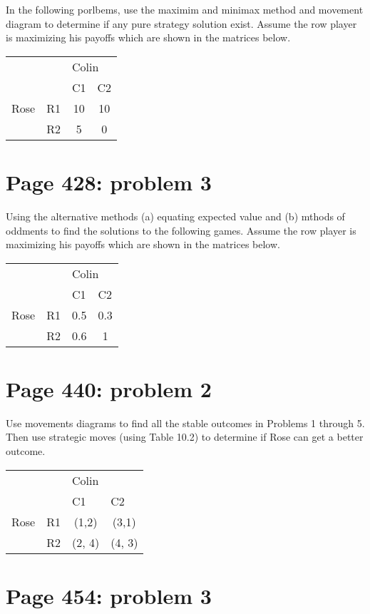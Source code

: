 \documentclass[]{article}
\begin{document}
In the following porlbems, use the maximim and minimax method and
movement diagram to determine if any pure strategy solution exist.
Assume the row player is maximizing his payoffs which are shown in the
matrices below.

\begin{table}[!h]
\centering
\begin{tabular}{lllc}
 &  & \multicolumn{2}{l}{Colin} \\ \cline{3-4}
 &  & C1 & \multicolumn{1}{l}{C2} \\ \hline
Rose & R1 & \multicolumn{1}{c}{10} & 10 \\
 & R2 & \multicolumn{1}{c}{5} & 0 \\ \hline
\end{tabular}
\end{table}

\section{Page 428: problem 3}\label{page-428-problem-3}

Using the alternative methods (a) equating expected value and (b) mthods
of oddments to find the solutions to the following games. Assume the row
player is maximizing his payoffs which are shown in the matrices below.

\begin{table}[!h]
\centering
\begin{tabular}{lllc}
 &  & \multicolumn{2}{l}{Colin} \\ \cline{3-4}
 &  & C1 & \multicolumn{1}{l}{C2} \\ \hline
Rose & R1 & \multicolumn{1}{c}{0.5} & 0.3 \\
 & R2 & \multicolumn{1}{c}{0.6} & 1 \\ \hline
\end{tabular}
\end{table}

\section{Page 440: problem 2}\label{page-440-problem-2}

Use movements diagrams to find all the stable outcomes in Problems 1
through 5. Then use strategic moves (using Table 10.2) to determine if
Rose can get a better outcome.

\begin{table}[!h]
\centering
\begin{tabular}{lllc}
 &  & \multicolumn{2}{l}{Colin} \\ \cline{3-4}
 &  & C1 & \multicolumn{1}{l}{C2} \\ \hline
Rose & R1 & \multicolumn{1}{c}{(1,2)} & (3,1) \\
 & R2 & \multicolumn{1}{c}{(2, 4)} & (4, 3)\\ \hline
\end{tabular}
\end{table}

\section{Page 454: problem 3}\label{page-454-problem-3}
\end{document}
